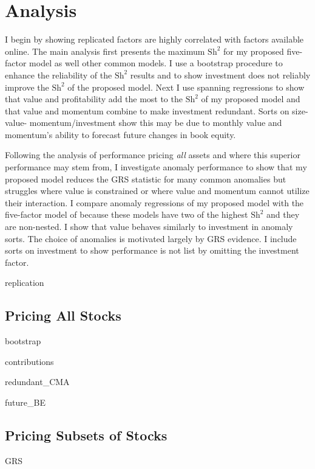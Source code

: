 
\section{Analysis}

I begin by showing replicated factors are highly correlated with factors available online.
The main analysis first presents the maximum $\text{Sh}^2$ for my proposed five-factor
model as well other common models. I use a bootstrap procedure to enhance the reliability
of the $\text{Sh}^2$ results and to show investment does not reliably improve the
$\text{Sh}^2$ of the proposed model. Next I use spanning regressions to show that value
and profitability add the most to the $\text{Sh}^2$ of my proposed model and that value
and momentum combine to make investment redundant. Sorts on size-value-
momentum/investment show this may be due to monthly value and momentum's ability to
forecast future changes in book equity.

Following the analysis of performance pricing \emph{all} assets and where this superior
performance may stem from, I investigate anomaly performance to show that my proposed
model reduces the GRS statistic for many common anomalies but struggles where value is
constrained or where value and momentum cannot utilize their interaction. I compare
anomaly regressions of my proposed model with the five-factor model of
\textcite{fama2016dissecting} because these models have two of the highest $\text{Sh}^2$
and they are non-nested. I show that value behaves similarly to investment in anomaly
sorts. The choice of anomalies is motivated largely by GRS evidence. I include sorts on
investment to show performance is not list by omitting the investment factor.

{replication}

\subsection{Pricing All Stocks}

{bootstrap}

{contributions}

{redundant_CMA}

{future_BE}

\subsection{Pricing Subsets of Stocks}

{GRS}


